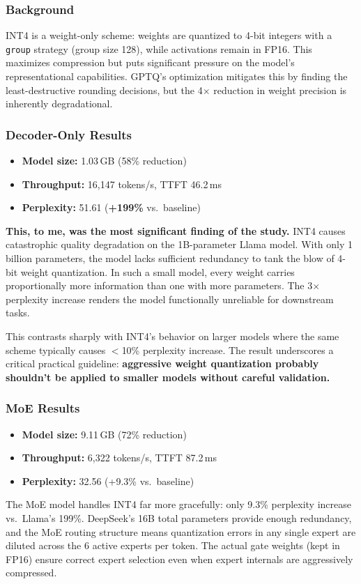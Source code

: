 \documentclass[10pt,twocolumn]{article}
\begin{document}
\subsubsection{Background}
INT4 is a weight-only scheme: weights are quantized to 4-bit integers with a \texttt{group} strategy (group size 128), while activations remain in FP16. This maximizes compression but puts significant pressure on the model's representational capabilities. GPTQ's optimization mitigates this by finding the least-destructive rounding decisions, but the 4$\times$ reduction in weight precision is inherently degradational.

\subsubsection{Decoder-Only Results}
\begin{itemize}
  \item \textbf{Model size:} 1.03\,GB (58\% reduction)
  \item \textbf{Throughput:} 16{,}147 tokens/s, TTFT 46.2\,ms
  \item \textbf{Perplexity:} 51.61 (\textbf{+199\%} vs.\ baseline)
\end{itemize}
\textbf{This, to me, was the most significant finding of the study.} INT4 causes catastrophic quality degradation on the 1B-parameter Llama model. With only 1 billion parameters, the model lacks sufficient redundancy to tank the blow of 4-bit weight quantization. In such a small model, every weight carries proportionally more information than one with more parameters. The 3$\times$ perplexity increase renders the model functionally unreliable for downstream tasks.

This contrasts sharply with INT4's behavior on larger models where the same scheme typically causes $<$10\% perplexity increase. The result underscores a critical practical guideline: \textbf{aggressive weight quantization probably shouldn't be applied to smaller models without careful validation.}

\subsubsection{MoE Results}
\begin{itemize}
  \item \textbf{Model size:} 9.11\,GB (72\% reduction)
  \item \textbf{Throughput:} 6{,}322 tokens/s, TTFT 87.2\,ms
  \item \textbf{Perplexity:} 32.56 (+9.3\% vs.\ baseline)
\end{itemize}
The MoE model handles INT4 far more gracefully: only 9.3\% perplexity increase vs.\ Llama's 199\%. DeepSeek's 16B total parameters provide enough redundancy, and the MoE routing structure means quantization errors in any single expert are diluted across the 6 active experts per token. The actual gate weights (kept in FP16) ensure correct expert selection even when expert internals are aggressively compressed.
\end{document}
